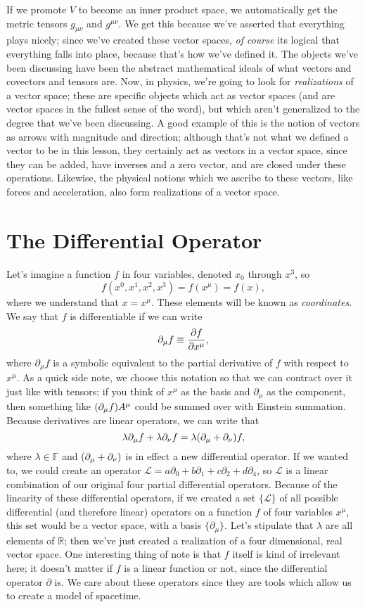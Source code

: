 If we promote $V$ to become an inner product space, we automatically get the metric tensors $g_{\mu\nu}$ and $g^{\mu\nu}$.
We get this because we've asserted that everything plays nicely; since we've created these vector spaces, \emph{of course} its logical that everything falls into place, because that's how we've defined it.
The objects we've been discussing have been the abstract mathematical ideals of what vectors and covectors and tensors are.
Now, in physics, we're going to look for \emph{realizations} of a vector space; these are specific objects which act as vector spaces (and are vector spaces in the fullest sense of the word), but which aren't generalized to the degree that we've been discussing.
A good example of this is the notion of vectors as arrows with magnitude and direction; although that's not what we defined a vector to be in this lesson, they certainly act as vectors in a vector space, since they can be added, have inverses and a zero vector, and are closed under these operations.
Likewise, the physical notions which we ascribe to these vectors, like forces and acceleration, also form realizations of a vector space.

\section{The Differential Operator}
Let's imagine a function $f$ in four variables, denoted $x_0$ through $x^3$, so
\[ f(x^0,x^1,x^2,x^3) = f(x^\mu) = f(x), \]
where we understand that $x = x^\mu$.
These elements will be known as \emph{coordinates}.
We say that $f$ is differentiable if we can write
\begin{align*}
    \partial_\mu f \equiv \pdv{f}{x^\mu},
\end{align*}
where $\partial_\mu f$ is a symbolic equivalent to the partial derivative of $f$ with respect to $x^\mu$.
As a quick side note, we choose this notation so that we can contract over it just like with tensors; if you think of $x^\mu$ as the basis and $\partial_\mu$ as the component, then something like $\qty(\partial_\mu f)A^\mu$ could be summed over with Einstein summation.
Because derivatives are linear operators, we can write that 
\[ \lambda\partial_\mu f + \lambda\partial_\nu f = \lambda\qty(\partial_\mu + \partial_\nu) f, \]
where $\lambda \in \mathbb{F}$ and $\qty(\partial_\mu + \partial_\nu)$ is in effect a new differential operator.
If we wanted to, we could create an operator $\mathcal{L} = a\partial_0 + b\partial_1 + c\partial_2 + d\partial_4$, so $\mathcal{L}$ is a linear combination of our original four partial differential operators.
Because of the linearity of these differential operators, if we created a set $\{\mathcal{L}\}$ of all possible differential (and therefore linear) operators on a function $f$ of four variables $x^\mu$, this set would be a vector space, with a basis $\{\partial_\mu\}$.
Let's stipulate that $\lambda$ are all elements of $\mathbb{R}$; then we've just created a realization of a four dimensional, real vector space.
One interesting thing of note is that $f$ itself is kind of irrelevant here; it doesn't matter if $f$ is a linear function or not, since the differential operator $\partial$ is.
We care about these operators since they are tools which allow us to create a model of spacetime.

